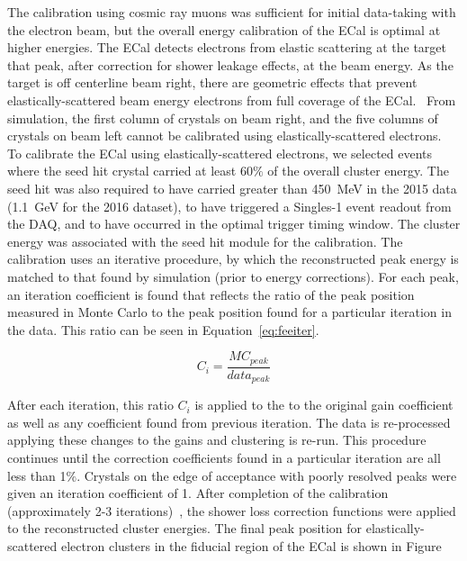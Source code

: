 The calibration using cosmic ray muons was sufficient for initial data-taking with the electron beam, but the overall energy calibration of the ECal is optimal at higher energies. The ECal detects electrons from elastic scattering at the target that peak, after correction for shower leakage effects, at the beam energy. As the target is off centerline beam right, there are geometric effects that prevent elastically-scattered beam energy electrons from full coverage of the ECal.~\cite{CalibNote} From simulation, the first column of crystals on beam right, and the five columns of crystals on beam left cannot be calibrated using elastically-scattered electrons. \\
\indent To calibrate the ECal using elastically-scattered electrons, we selected events where the seed hit crystal carried at least 60$\%$ of the overall cluster energy. The seed hit was also required to have carried greater than 450~MeV in the 2015 data (1.1~GeV for the 2016 dataset), to have triggered a Singles-1  event readout from the DAQ, and to have occurred in the optimal trigger timing window. The cluster energy was associated with the seed hit module for the calibration. The calibration uses an iterative procedure, by which the reconstructed peak energy is matched to that found by simulation (prior to energy corrections). For each peak, an iteration coefficient is found that reflects the ratio of the peak position measured in Monte Carlo to the peak position found for a particular iteration in the data. This ratio can be seen in Equation~\eqref{eq:feeiter}.

\begin{equation}
	\label{eq:feeiter}
	C_i = \dfrac{MC_{peak}}{data_{peak}}
\end{equation}

After each iteration, this ratio $C_i$ is applied to the to the original gain coefficient as well as any coefficient found from previous iteration. The data is re-processed applying these changes to the gains and clustering is re-run. This procedure continues until the correction coefficients found in a particular iteration are all less than 1$\%$. Crystals on the edge of acceptance with poorly resolved peaks were given an iteration coefficient of 1. After completion of the calibration (approximately 2-3 iterations)~\cite{CalibNote}, the shower loss correction functions were applied to the reconstructed cluster energies. The final peak position for elastically-scattered electron clusters in the fiducial region of the ECal is shown in Figure

